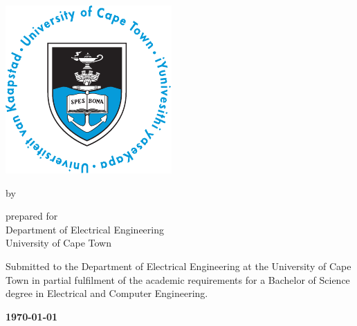 \begin{titlepage}
  \null\vfill
  {\centering\LARGE\bfseries\thetitle\par}
  \vfill
  \vspace{10mm}
  {\centering\includegraphics[scale=1.1]{figures/logo}\par}
  \vfill
  \begin{center}by \textsc{\theauthor}\end{center}
  \vfill
  {\centering prepared for \textsc{\thesupervisor}\\ Department of Electrical Engineering\\ University of Cape Town\par}
  \vfill
  \noindent
  Submitted to the Department of Electrical Engineering at the University of Cape Town in partial fulfilment of the academic requirements for a Bachelor of Science degree in Electrical and Computer Engineering.
  \vfill
  \begin{center}\bfseries\today\end{center}
\end{titlepage}
